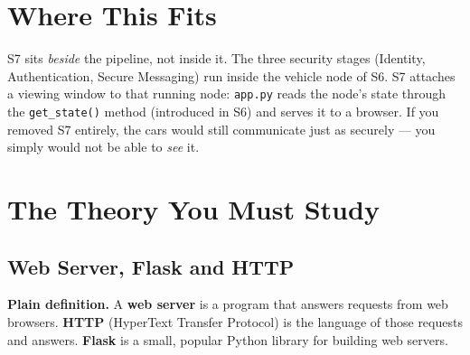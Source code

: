 \documentclass[11pt,a4paper]{article}
\begin{document}
\section{Where This Fits}

S7 sits \emph{beside} the pipeline, not inside it. The three security stages
(Identity, Authentication, Secure Messaging) run inside the vehicle node of S6.
S7 attaches a viewing window to that running node: \texttt{app.py} reads the
node's state through the \texttt{get\_state()} method (introduced in S6) and
serves it to a browser. If you removed S7 entirely, the cars would still
communicate just as securely --- you simply would not be able to \emph{see} it.

\begin{center}
\end{center}

\section{The Theory You Must Study}

\subsection{Web Server, Flask and HTTP}
\textbf{Plain definition.} A \textbf{web server} is a program that answers
requests from web browsers. \textbf{HTTP} (HyperText Transfer Protocol) is the
language of those requests and answers. \textbf{Flask} is a small, popular Python
library for building web servers.
\end{document}
